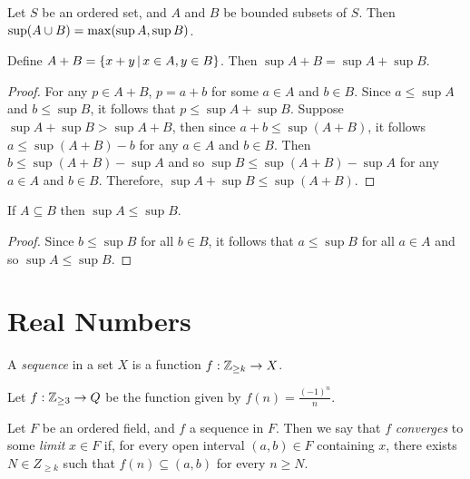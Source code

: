 \begin{prop}
    Let $S$ be an ordered set, and $A$ and $B$ be bounded subsets of $S$. Then $\sup (A \cup B) = \max (\sup A, \sup B)$.
\end{prop}

\begin{prop}
    Define $A + B = \left\{x + y \,\middle|\, x \in A, y \in B\right\}$. Then $\sup A + B = \sup A + \sup B$.
\end{prop}

\begin{proof}
    For any $p \in A + B$, $p = a + b$ for some $a \in A$ and $b \in B$. Since $a \leq \sup A$ and $b \leq \sup B$, it follows that $p \leq \sup A + \sup B$. Suppose $\sup A + \sup B > \sup A + B$, then since $a + b \leq \sup (A + B)$, it follows $a \leq \sup (A + B) - b$ for any $a \in A$ and $b \in B$. Then $b \leq \sup (A + B) - \sup A$ and so $\sup B \leq \sup (A + B) - \sup A$ for any $a \in A$ and $b \in B$. Therefore, $\sup A + \sup B \leq \sup (A + B)$.
\end{proof}

\begin{prop}
    If $A \subseteq B$ then $\sup A \leq \sup B$.
\end{prop}

\begin{proof}
    Since $b \leq \sup B$ for all $b \in B$, it follows that $a \leq \sup B$ for all $a \in A$ and so $\sup A \leq \sup B$.
\end{proof}

\section{Real Numbers}

\begin{defn}
    A \emph{sequence} in a set $X$ is a function $f: \mathbb{Z}_{\geq k} \to X$.
\end{defn}

\begin{exmp}
    Let $f: \mathbb{Z}_{\geq 3} \to Q$ be the function given by $f(n) = \frac{(-1)^n}{n}$.
\end{exmp}

\begin{defn}
    Let $F$ be an ordered field, and $f$ a sequence in $F$. Then we say that $f$ \emph{converges} to some \emph{limit} $x \in F$ if, for every open interval $(a, b) \in F$ containing $x$, there exists $N \in Z_{\geq k}$ such that $f(n) \subseteq (a, b)$ for every $n \geq N$.
\end{defn}

